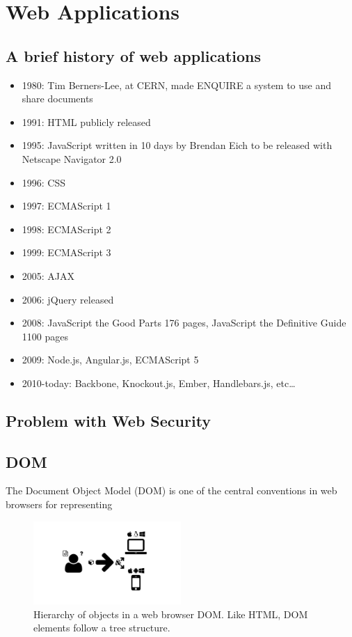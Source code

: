 \section{Web Applications}

\subsection{A brief history of web applications}
\autocite{w3c2014history}
\autocite{berners2014design}
\begin{itemize}
  \item 1980: Tim Berners-Lee, at CERN, made ENQUIRE a system to use and share documents
  \item 1991: HTML publicly released
  \item 1995: JavaScript written in 10 days by Brendan Eich to be released with Netscape Navigator 2.0
  \item 1996: CSS
  \item 1997: ECMAScript 1
  \item 1998: ECMAScript 2
  \item 1999: ECMAScript 3
  \item 2005: AJAX \autocite{garrett2005ajax}
  \item 2006: jQuery released
  \item 2008: JavaScript the Good Parts 176 pages, JavaScript the Definitive Guide 1100 pages
  \item 2009: Node.js, Angular.js, ECMAScript 5
  \item 2010-today: Backbone, Knockout.js, Ember, Handlebars.js, etc\ldots
\end{itemize}

\subsection{Problem with Web Security}

\autocite{grier2008secure}

\subsection{DOM}

The Document Object Model (DOM) is one of the central conventions in web browsers for representing

\begin{figure}
  \centering
  \includegraphics[width=0.5\textwidth, page=22, trim=0cm 0cm 11cm 0cm, clip=true]{images/Figures.pdf}
  \caption{Hierarchy of objects in a web browser DOM. Like HTML, DOM elements follow a tree structure.}
  \label{Figure:dom}
\end{figure}


